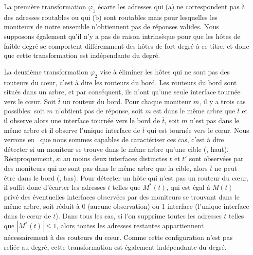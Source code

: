 La première transformation $\varphi_1$ écarte les adresses qui (a) ne
correspondent pas à des adresses \ip routables  ou qui (b) sont
routables mais pour lesquelles les moniteurs de notre ensemble n'obtiennent pas
de réponses valides. Nous supposons également qu'il n'y a pas de raison
intrinsèque pour que les hôtes de faible degré se comportent différemment des
hôtes de fort degré à ce titre, et donc que cette transformation est
indépendante du degré.

La deuxième transformation $\varphi_2$ vise à éliminer les hôtes qui ne sont pas
des routeurs du c\oe{}ur, c'est à dire les routeurs du bord. Les routeurs du
bord sont situés dans un arbre, et par conséquent, ils n'ont qu'une seule
interface tournée vers le c\oe{}ur. Soit $\overline{t}$ un routeur du bord. Pour
chaque moniteur $m$, il y a trois cas possibles: soit $m$ n'obtient pas de
réponse, soit $m$ est dans le même arbre que $\overline{t}$ et il observe alors
une interface tournée vers le bord de $\overline{t}$, soit $m$ n'est pas dans le
même arbre et il observe l'unique interface de $\overline{t}$ qui est tournée
vers le c\oe{}ur. Nous verrons en~ que nous
sommes capables de caractériser ces cas, c'est à dire détecter si un moniteur se
trouve dans le même arbre qu'une cible (, haut).
Réciproquement, si au moins deux interfaces distinctes $t$ et $t'$ sont
observées par des moniteurs qui ne sont pas dans le même arbre que la cible,
alors $\overline{t}$ ne peut être dans le bord (,
bas).
Pour détecter un hôte qui n'est pas un routeur du c\oe{}ur, il suffit donc
d'écarter les adresses $t$ telles que $M^*(t)$, qui est égal à $M(t)$ privé des
éventuelles interfaces observées par des moniteurs se trouvant dans le même
arbre, soit réduit à 0 (aucune observation) ou 1 interface (l'unique interface
dans le c\oe{}ur de $\overline{t}$). Dans tous les cas, si l'on supprime toutes
les adresses $\overline{t}$ telles que $|M^*(t)| \leq 1$, alors toutes les
adresses restantes appartiennent nécessairement à des routeurs du c\oe{}ur.
Comme cette configuration n'est pas reliée au degré, cette transformation est
également indépendante du degré.

